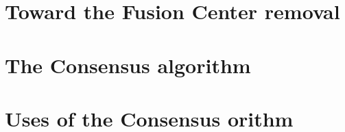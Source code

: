 \section{Toward the Fusion Center removal}

\section{The Consensus algorithm}

\section{Uses of the Consensus orithm}
